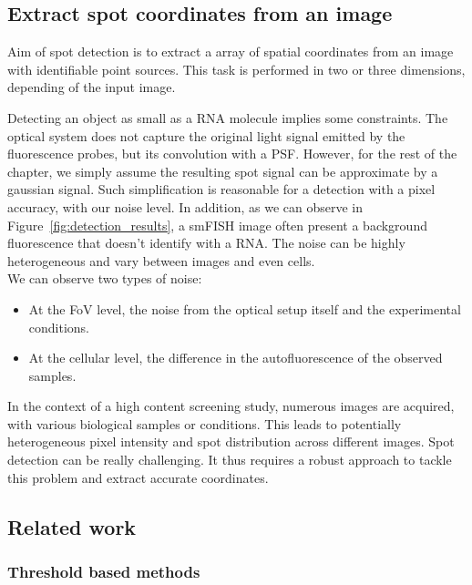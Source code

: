 \subsection{Extract spot coordinates from an image}
\label{subsec:detection}

Aim of spot detection is to extract a array of spatial coordinates from an image with identifiable point sources.
This task is performed in two or three dimensions, depending of the input image.

Detecting an object as small as a \ac{RNA} molecule implies some constraints.
The optical system does not capture the original light signal emitted by the fluorescence probes, but its convolution with a \ac{PSF}.
However, for the rest of the chapter, we simply assume the resulting spot signal can be approximate by a gaussian signal.
Such simplification is reasonable for a detection with a pixel accuracy, with our noise level.
In addition, as we can observe in Figure~\ref{fig:detection_results}, a \ac{smFISH} image often present a background fluorescence that doesn't identify with a \ac{RNA}.
The noise can be highly heterogeneous and vary between images and even cells.\\

\noindent
We can observe two types of noise:
\begin{itemize}
	\item At the \ac{FoV} level, the noise from the optical setup itself and the experimental conditions.
	\item At the cellular level, the difference in the autofluorescence of the observed samples.
\end{itemize}

In the context of a high content screening study, numerous images are acquired, with various biological samples or conditions.
This leads to potentially heterogeneous pixel intensity and spot distribution across different images.
Spot detection can be really challenging.
It thus requires a robust approach to tackle this problem and extract accurate coordinates.

\subsection{Related work}
\label{subsec:detection_related_work}

\subsubsection{Threshold based methods}

